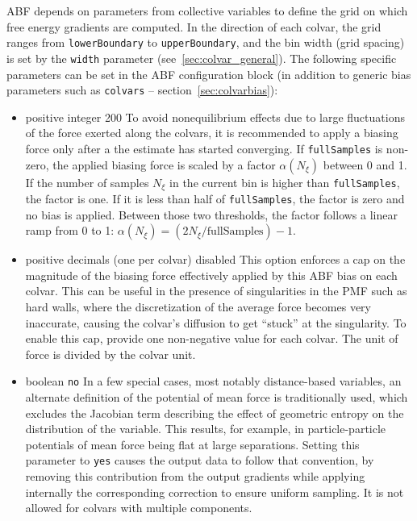 
ABF depends on parameters from collective variables to define the grid on which free
energy gradients are computed. In the direction of each colvar, the grid ranges from
\texttt{lowerBoundary} to \texttt{upperBoundary}, and the bin width (grid spacing)
is set by the \texttt{width} parameter (see~\ref{sec:colvar_general}).
The following specific parameters can be set in the ABF configuration block
(in addition to generic bias parameters such as \texttt{colvars}
-- section~\ref{sec:colvarbias}):

\begin{itemize}
\item {}
  {positive integer}
  {200}
  {To avoid nonequilibrium effects due to large fluctuations of the force exerted along the
   colvars, it is recommended to apply a biasing force only after a the estimate has started
   converging. If \texttt{fullSamples} is non-zero, the applied biasing force is scaled by a factor
   $\alpha(N_\xi)$ between 0 and 1.
   If the number of samples $N_\xi$ in the current bin is higher than \texttt{fullSamples},
   the factor is one. If it is less than half of \texttt{fullSamples}, the factor is zero and
   no bias is applied. Between those two thresholds, the factor follows a linear ramp from
   0 to 1: $\alpha(N_\xi) =(2N_\xi/\mathrm{fullSamples})-1$}.

\item {}
  {positive decimals (one per colvar)}
  {disabled}
  {This option enforces a cap on the magnitude of the biasing force effectively applied
   by this ABF bias on each colvar. This can be useful in the presence of singularities
   in the PMF such as hard walls, where the discretization of the average force becomes
   very inaccurate, causing the colvar's diffusion to get ``stuck'' at the singularity.
   To enable this cap, provide one non-negative value for each colvar. The unit of force
   is  divided by the colvar unit.}

\item {}
  {boolean}
  {\texttt{no}}
  {In a few special cases, most notably distance-based variables, an alternate definition of
    the potential of mean force is traditionally used, which excludes the Jacobian
    term describing the effect of geometric entropy on the distribution of the variable.
    This results, for example, in particle-particle potentials of mean force being flat
    at large separations.
    Setting this parameter to \texttt{yes} causes the output data to follow that convention,
    by removing this contribution from the output gradients while
    applying internally the corresponding correction to ensure uniform sampling.
    It is not allowed for colvars with multiple components.}


\end{itemize}
